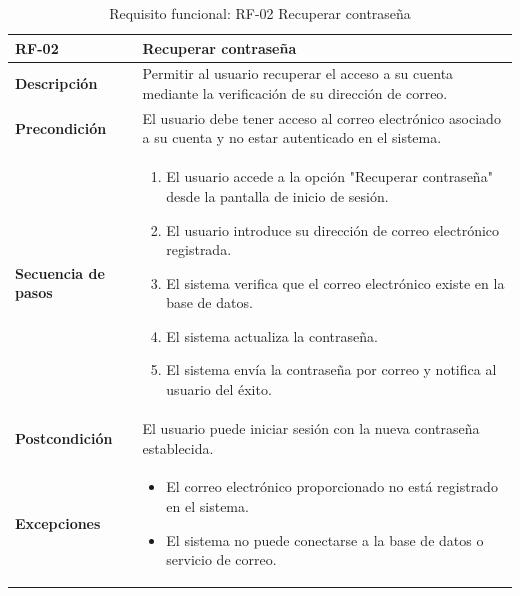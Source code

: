\begin{table}[H]
\centering
\begin{tabularx}{\textwidth}{
  |>{\centering\arraybackslash}l
  |>{\centering\arraybackslash}X|}
\hline

\textbf{RF-02} & \textbf{Recuperar contraseña} \\ \hline

\textbf{Descripción} & Permitir al usuario recuperar el acceso a su cuenta mediante la verificación de su dirección de correo. \\ \hline

\textbf{Precondición} & El usuario debe tener acceso al correo electrónico asociado a su cuenta y no estar autenticado en el sistema. \\ \hline

\textbf{Secuencia de pasos} & 
\begin{enumerate}
  \item El usuario accede a la opción "Recuperar contraseña" desde la pantalla de inicio de sesión.
  \item El usuario introduce su dirección de correo electrónico registrada.
  \item El sistema verifica que el correo electrónico existe en la base de datos.
  \item El sistema actualiza la contraseña.
  \item El sistema envía la contraseña por correo y notifica al usuario del éxito.
\end{enumerate} \\ \hline

\textbf{Postcondición} & El usuario puede iniciar sesión con la nueva contraseña establecida. \\ \hline

\textbf{Excepciones} & 
\begin{itemize}
  \item El correo electrónico proporcionado no está registrado en el sistema.
  \item El sistema no puede conectarse a la base de datos o servicio de correo.
\end{itemize} \\ \hline
\end{tabularx}
\caption{Requisito funcional: RF-02 Recuperar contraseña}
\end{table}
